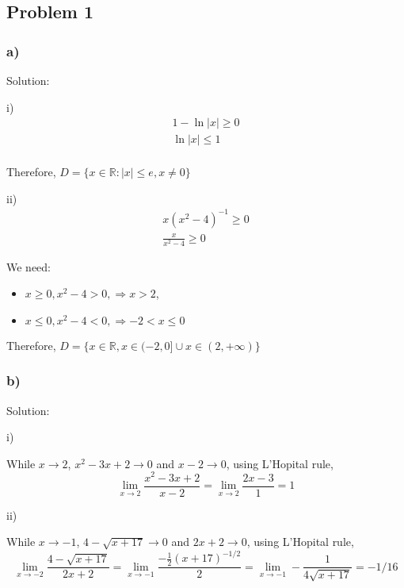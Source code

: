 \documentclass[letterpaper, 11pt]{article}
\newcommand{\1}{\mathds{1}}	%
\theoremstyle{definition}
\begin{document}
\subsection*{Problem 1}

\subsubsection*{a)}
Solution:

i)
\begin{align*}
  1 - \ln|x| \geq 0 \\
  \ln|x| \leq 1     \\
\end{align*}

Therefore, $D = \{x \in \mathbb{R}: |x| \leq e, x \neq 0  \}$

ii)
\begin{align*}
  x(x^{2} - 4)^{-1} \geq 0 \\
  \frac{x}{x^2 - 4} \geq 0
\end{align*}

We need:
\begin{itemize}
  \item $x \geq 0, x^2 - 4 > 0,  \Rightarrow x > 2$,
  \item $x \leq 0, x^2 -4 < 0, \Rightarrow -2 < x \leq 0$
\end{itemize}

Therefore, $D = \{ x \in \mathbb{R}, x \in (-2, 0] \cup x \in (2, +\infty) \}$

  \subsubsection*{b)}

  Solution:

  i)

  While $x \to 2$, $x^2 - 3x + 2 \to 0$ and $x -2 \to 0 $, using L'Hopital rule, \begin{equation*}
    \lim_{x \to 2}\frac{x^2 - 3x + 2}{x - 2} = \lim_{x \to 2}\frac{2x-3}{1} = 1
  \end{equation*}

  ii)

  While $x \to -1$, $4 - \sqrt{x+17} \to 0$ and $2x+2 \to 0$, using L'Hopital rule, \begin{equation*}
    \lim_{x \to -2}\frac{4 - \sqrt{x+17}}{2x+2} =  \lim_{x \to -1}\frac{-\frac{1}{2}(x+17)^{-1/2}}{2} = \lim_{x \to -1}-\frac{1}{4 \sqrt{x+17}} = -1/16
  \end{equation*}
\end{document}
